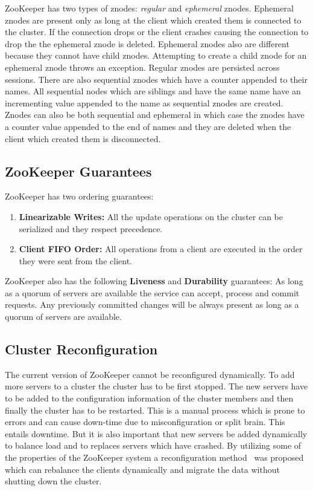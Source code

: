 ZooKeeper has two types of znodes: \textit{regular} and \textit{ephemeral} znodes. Ephemeral znodes are present only as long at the client which created them is connected to the cluster. If the connection drops or the client crashes causing the connection to drop the the ephemeral znode is deleted. Ephemeral znodes also are different because they cannot have child znodes. Attempting to create a child znode for an ephemeral znode throws an exception. Regular znodes are persisted across sessions. There are also sequential znodes which have a counter appended to their names. All sequential nodes which are siblings and have the same name have an incrementing value appended to the name as sequential znodes are created. Znodes can also be both sequential and ephemeral in which case the znodes have a counter value appended to the end of names and they are deleted when the client which created them is disconnected.
\vspace{1.5em}


\subsection{ZooKeeper Guarantees}
ZooKeeper has two ordering guarantees:
\begin{enumerate}
	\item \textbf{Linearizable Writes:} All the update operations on the cluster can be serialized and they respect precedence.
	\item \textbf{Client FIFO Order:} All operations from a client are executed in the order they were sent from the client.
\end{enumerate}
ZooKeeper also has the following \textbf{Liveness} and \textbf{Durability} guarantees: As long as a quorum of servers are available the service can accept, process and commit requests. Any previously committed changes will be always present as long as a quorum of servers are available.

\subsection{Cluster Reconfiguration}
	The current version of ZooKeeper cannot be reconfigured dynamically. To add more servers to a cluster the cluster has to be first stopped. The new servers have to be added to the configuration information of the cluster members and then finally the cluster has to be restarted. This is a manual process which is prone to errors and can cause down-time due to misconfiguration or split brain. This entails downtime. But it is also important that new servers be added dynamically to balance load and to replaces servers which have crashed. By utilizing some of the properties of the ZooKeeper system a reconfiguration method~\cite{shraer2012dynamic} was proposed which can rebalance the clients dynamically and migrate the data without shutting down the cluster.

